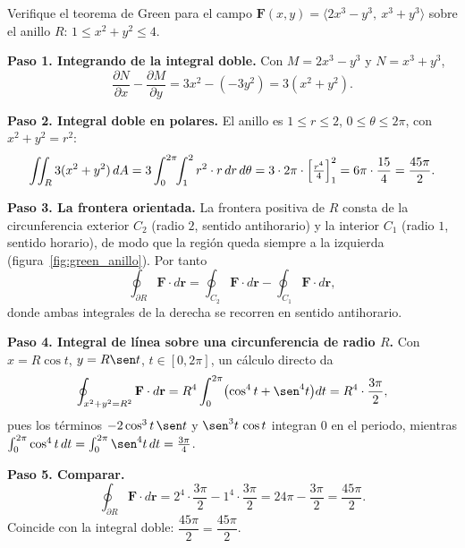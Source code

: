 \begin{prob}
Verifique el teorema de Green para el campo
$\mathbf F(x,y)=\langle 2x^3-y^3,\ x^3+y^3\rangle$ sobre el anillo
$R:\,1\le x^2+y^2\le 4$.
\begin{myproof}
\textbf{Paso 1. Integrando de la integral doble.}
Con $M=2x^3-y^3$ y $N=x^3+y^3$,
\[
\frac{\partial N}{\partial x}-\frac{\partial M}{\partial y}
=3x^2-(-3y^2)=3(x^2+y^2).
\]

\textbf{Paso 2. Integral doble en polares.}
El anillo es $1\le r\le 2$, $0\le\theta\le 2\pi$, con $x^2+y^2=r^2$:
\[
\iint_R 3(x^2+y^2)\,dA
=3\int_0^{2\pi}\!\!\int_1^2 r^2\cdot r\,dr\,d\theta
=3\cdot 2\pi\cdot\Bigl[\tfrac{r^4}{4}\Bigr]_1^2
=6\pi\cdot\frac{15}{4}=\frac{45\pi}{2}.
\]

\textbf{Paso 3. La frontera orientada.}
La frontera positiva de $R$ consta de la circunferencia exterior $C_2$ (radio
$2$, sentido antihorario) y la interior $C_1$ (radio $1$, sentido horario),
de modo que la región queda siempre a la izquierda
(figura~\ref{fig:green_anillo}). Por tanto
\[
\oint_{\partial R}\mathbf F\cdot d\mathbf r
=\oint_{C_2}\mathbf F\cdot d\mathbf r-\oint_{C_1}\mathbf F\cdot d\mathbf r,
\]
donde ambas integrales de la derecha se recorren en sentido antihorario.

\textbf{Paso 4. Integral de línea sobre una circunferencia de radio $R$.}
Con $x=R\cos t$, $y=R\sen t$, $t\in[0,2\pi]$, un cálculo directo da
\[
\oint_{x^2+y^2=R^2}\mathbf F\cdot d\mathbf r
=R^4\int_0^{2\pi}\bigl(\cos^4 t+\sen^4 t\bigr)dt
=R^4\cdot\frac{3\pi}{2},
\]
pues los términos $-2\cos^3 t\,\sen t$ y $\sen^3 t\,\cos t$ integran $0$ en el
periodo, mientras $\int_0^{2\pi}\cos^4 t\,dt=\int_0^{2\pi}\sen^4 t\,dt=\tfrac{3\pi}{4}$.

\textbf{Paso 5. Comparar.}
\[
\oint_{\partial R}\mathbf F\cdot d\mathbf r
=2^4\cdot\frac{3\pi}{2}-1^4\cdot\frac{3\pi}{2}
=24\pi-\frac{3\pi}{2}=\frac{45\pi}{2}.
\]
Coincide con la integral doble: $\boxed{\dfrac{45\pi}{2}=\dfrac{45\pi}{2}}$.
\end{myproof}
\end{prob}

